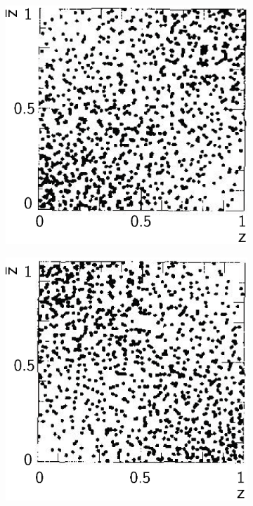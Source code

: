 \begin{figure}[htbp]
\centering %
  \begin{subfigure}[t]{0.45\textwidth}
    \includegraphics[width=\textwidth]{theory/TauZ}
    \caption{\ZToTauTau}
    \label{fig:theoryTauPairCorrelationZ}
  \end{subfigure}
  \begin{subfigure}[t]{0.45\textwidth}
    \includegraphics[width=\textwidth]{theory/TauH}

\end{subfigure}
\end{figure}
